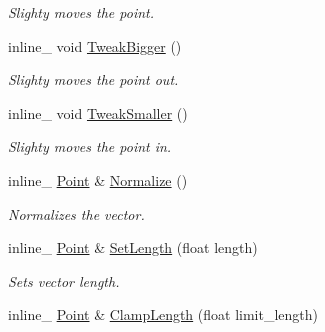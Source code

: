 \begin{DoxyCompactItemize}
\begin{DoxyCompactList}\small\item\em Slighty moves the point. \end{DoxyCompactList}\item 
inline\+\_\+ void \hyperlink{classOpcode_1_1Point_a842045be86197db3f07e14c721a7fff9}{Tweak\+Bigger} ()\hypertarget{classOpcode_1_1Point_a842045be86197db3f07e14c721a7fff9}{}\label{classOpcode_1_1Point_a842045be86197db3f07e14c721a7fff9}

\begin{DoxyCompactList}\small\item\em Slighty moves the point out. \end{DoxyCompactList}\item 
inline\+\_\+ void \hyperlink{classOpcode_1_1Point_a15a91365b81139d45f7fc953132cc65d}{Tweak\+Smaller} ()\hypertarget{classOpcode_1_1Point_a15a91365b81139d45f7fc953132cc65d}{}\label{classOpcode_1_1Point_a15a91365b81139d45f7fc953132cc65d}

\begin{DoxyCompactList}\small\item\em Slighty moves the point in. \end{DoxyCompactList}\item 
inline\+\_\+ \hyperlink{classOpcode_1_1Point}{Point} \& \hyperlink{classOpcode_1_1Point_a90d1e1cebf540dd8361fe0bc01136803}{Normalize} ()\hypertarget{classOpcode_1_1Point_a90d1e1cebf540dd8361fe0bc01136803}{}\label{classOpcode_1_1Point_a90d1e1cebf540dd8361fe0bc01136803}

\begin{DoxyCompactList}\small\item\em Normalizes the vector. \end{DoxyCompactList}\item 
inline\+\_\+ \hyperlink{classOpcode_1_1Point}{Point} \& \hyperlink{classOpcode_1_1Point_aa824c288b909858060c1527c8afe8800}{Set\+Length} (float length)\hypertarget{classOpcode_1_1Point_aa824c288b909858060c1527c8afe8800}{}\label{classOpcode_1_1Point_aa824c288b909858060c1527c8afe8800}

\begin{DoxyCompactList}\small\item\em Sets vector length. \end{DoxyCompactList}\item 
inline\+\_\+ \hyperlink{classOpcode_1_1Point}{Point} \& \hyperlink{classOpcode_1_1Point_a8e7ed362816741aa0377e57a08632862}{Clamp\+Length} (float limit\+\_\+length)\hypertarget{classOpcode_1_1Point_a8e7ed362816741aa0377e57a08632862}{}\label{classOpcode_1_1Point_a8e7ed362816741aa0377e57a08632862}


\end{DoxyCompactItemize}
